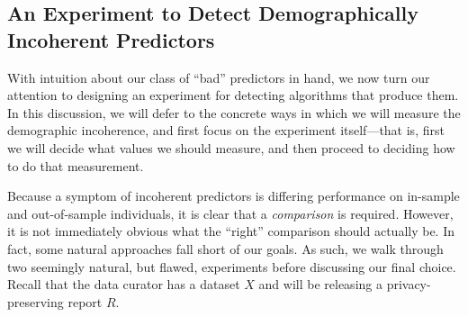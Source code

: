 \subsection{An Experiment to Detect Demographically Incoherent Predictors} \label{sec:detecting-incoheret-algorithms}

With intuition about our class of ``bad'' predictors in hand, we now turn our attention to designing an experiment for detecting algorithms that produce them. In this discussion, we will defer to the concrete ways in which we will measure the demographic incoherence, and first focus on the experiment itself—that is, first we will decide what values we should measure, and then proceed to deciding how to do that measurement.
 
Because a symptom of incoherent predictors is differing performance on in-sample and out-of-sample individuals, it is clear that a \emph{comparison} is required.  However, it is not immediately obvious  what the ``right'' comparison should actually be.  In fact, some natural approaches fall short of our goals. As such, we walk through two seemingly natural, but flawed, experiments before discussing our final choice. Recall that the data curator has a dataset $X$ and will be releasing a privacy-preserving report $R$.

